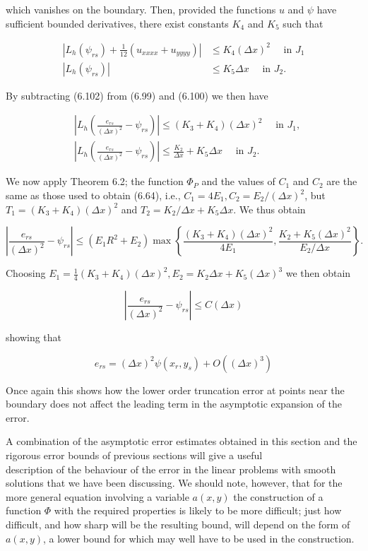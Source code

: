 \documentclass[10pt]{article}
\begin{document}
which vanishes on the boundary. Then, provided the functions \(u\) and \(\psi\) have sufficient bounded derivatives, there exist constants \(K_{4}\) and \(K_{5}\) such that

\[
\begin{aligned}
\left|L_{h}\left(\psi_{r s}\right)+\frac{1}{12}\left(u_{x x x x}+u_{y y y y}\right)\right| & \leq K_{4}(\Delta x)^{2} \quad \text { in } J_{1} \\
\left|L_{h}\left(\psi_{r s}\right)\right| & \leq K_{5} \Delta x \quad \text { in } J_{2} .
\end{aligned}
\]

By subtracting (6.102) from (6.99) and (6.100) we then have

\[
\begin{aligned}
& \left|L_{h}\left(\frac{e_{r s}}{(\Delta x)^{2}}-\psi_{r s}\right)\right| \leq\left(K_{3}+K_{4}\right)(\Delta x)^{2} \quad \text { in } J_{1}, \\
& \left|L_{h}\left(\frac{e_{r s}}{(\Delta x)^{2}}-\psi_{r s}\right)\right| \leq \frac{K_{2}}{\Delta x}+K_{5} \Delta x \quad \text { in } J_{2} .
\end{aligned}
\]

We now apply Theorem 6.2; the function \(\Phi_{P}\) and the values of \(C_{1}\) and \(C_{2}\) are the same as those used to obtain (6.64), i.e., \(C_{1}=4 E_{1}, C_{2}= E_{2} /(\Delta x)^{2}\), but \(T_{1}=\left(K_{3}+K_{4}\right)(\Delta x)^{2}\) and \(T_{2}=K_{2} / \Delta x+K_{5} \Delta x\). We thus obtain

\[
\left|\frac{e_{r s}}{(\Delta x)^{2}}-\psi_{r s}\right| \leq\left(E_{1} R^{2}+E_{2}\right) \max \left\{\frac{\left(K_{3}+K_{4}\right)(\Delta x)^{2}}{4 E_{1}}, \frac{K_{2}+K_{5}(\Delta x)^{2}}{E_{2} / \Delta x}\right\} .
\]

Choosing \(E_{1}=\frac{1}{4}\left(K_{3}+K_{4}\right)(\Delta x)^{2}, E_{2}=K_{2} \Delta x+K_{5}(\Delta x)^{3}\) we then obtain

\[
\left|\frac{e_{r s}}{(\Delta x)^{2}}-\psi_{r s}\right| \leq C(\Delta x)
\]

showing that

\[
e_{r s}=(\Delta x)^{2} \psi\left(x_{r}, y_{s}\right)+O\left((\Delta x)^{3}\right)
\]

Once again this shows how the lower order truncation error at points near the boundary does not affect the leading term in the asymptotic expansion of the error.

A combination of the asymptotic error estimates obtained in this section and the rigorous error bounds of previous sections will give a useful\\
description of the behaviour of the error in the linear problems with smooth solutions that we have been discussing. We should note, however, that for the more general equation involving a variable \(a(x, y)\) the construction of a function \(\Phi\) with the required properties is likely to be more difficult; just how difficult, and how sharp will be the resulting bound, will depend on the form of \(a(x, y)\), a lower bound for which may well have to be used in the construction.
\end{document}
